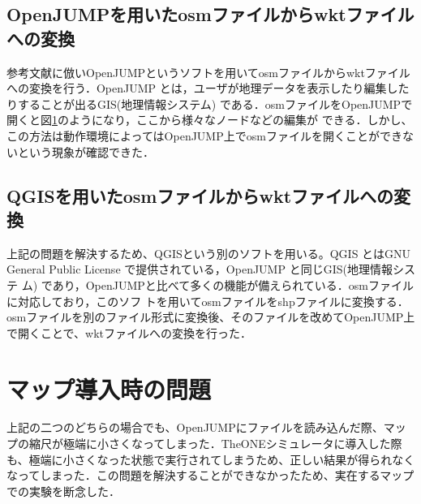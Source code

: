 \documentclass[11pt]{icsthesis}
\begin{document}
\subsection{OpenJUMPを用いたosmファイルからwktファイルへの変換}
参考文献に倣いOpenJUMPというソフトを用いてosmファイルからwktファイルへの変換を行う．OpenJUMP とは，ユーザが地理データを表示したり編集したりすることが出るGIS(地理情報システム)
である．osmファイルをOpenJUMPで開くと図\ref{}のようになり，ここから様々なノードなどの編集が
できる．しかし、この方法は動作環境によってはOpenJUMP上でosmファイルを開くことができないという現象が確認できた．
\subsection{QGISを用いたosmファイルからwktファイルへの変換}
上記の問題を解決するため、QGISという別のソフトを用いる。QGIS とはGNU General Public License で提供されている，OpenJUMP と同じGIS(地理情報システ
ム) であり，OpenJUMPと比べて多くの機能が備えられている．osmファイルに対応しており，このソフ
トを用いてosmファイルをshpファイルに変換する．osmファイルを別のファイル形式に変換後、そのファイルを改めてOpenJUMP上で開くことで、wktファイルへの変換を行った．
\section{マップ導入時の問題}
上記の二つのどちらの場合でも、OpenJUMPにファイルを読み込んだ際、マップの縮尺が極端に小さくなってしまった．TheONEシミュレータに導入した際も、極端に小さくなった状態で実行されてしまうため、正しい結果が得られなくなってしまった．この問題を解決することができなかったため、実在するマップでの実験を断念した．
\end{document}
